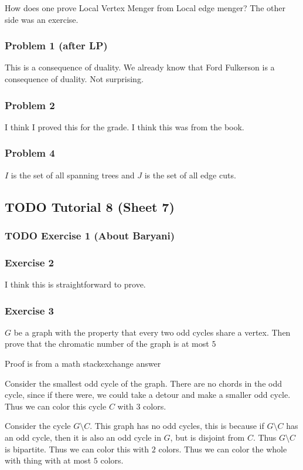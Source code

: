 \documentclass[11pt]{article}
\begin{document}
How does one prove Local Vertex Menger from Local edge menger? The other
side was an exercise.
\subsubsection{Problem 1 (after LP)}
\label{sec:org622d629}
This is a consequence of duality. We already know that Ford Fulkerson is a
consequence of duality. Not surprising.
\subsubsection{Problem 2}
\label{sec:orgb2d2b60}
I think I proved this for the grade. I think this was from the book.
\subsubsection{Problem 4}
\label{sec:orgfcd891e}
\(I\) is the set of all spanning trees and \(J\) is the set of all edge cuts.
\subsection{{\bfseries\sffamily TODO} Tutorial 8 (Sheet 7)}
\label{sec:orgeba72d5}
\subsubsection{{\bfseries\sffamily TODO} Exercise 1 (About Baryani)}
\label{sec:org065e0e9}
\subsubsection{Exercise 2}
\label{sec:org08cb0d2}
I think this is straightforward to prove.
\subsubsection{Exercise 3}
\label{sec:org3cb09e1}
\(G\) be a graph with the property that every two odd cycles share a vertex.
Then prove that the chromatic number of the graph is at most \(5\)

Proof is from a math stackexchange answer

Consider the smallest odd cycle of the graph. There are no chords in the odd
cycle, since if there were, we could take a detour and make a smaller odd
cycle. Thus we can color this cycle \(C\) with \(3\) colors.

Consider the cycle \(G \setminus C\). This graph has no odd cycles, this is
because if \(G \setminus C\) has an odd cycle, then it is also an odd cycle in
\(G\), but is disjoint from \(C\). Thus \(G \setminus C\) is bipartite. Thus we
can color this with \(2\) colors. Thus we can color the whole with thing with
at most \(5\) colors.
\end{document}
